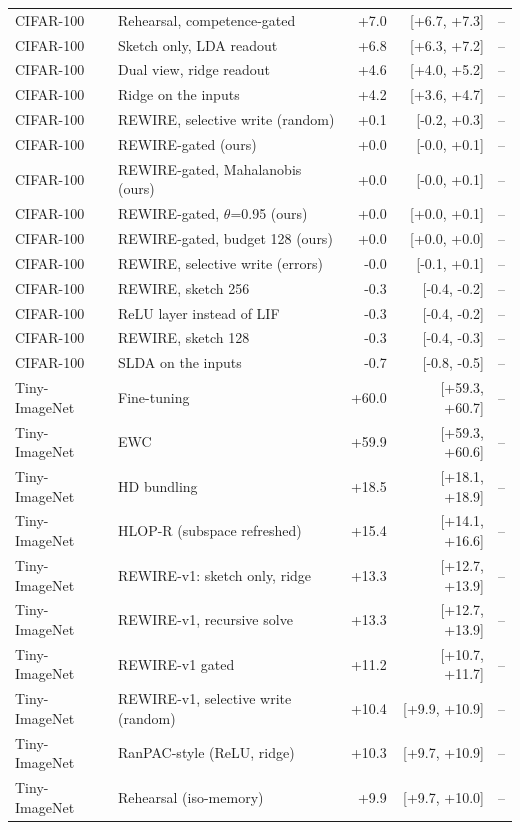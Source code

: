 \begin{tabular}{llrrr}
CIFAR-100 & Rehearsal, competence-gated & +7.0 & [+6.7, +7.3] & -- \\
CIFAR-100 & Sketch only, LDA readout & +6.8 & [+6.3, +7.2] & -- \\
CIFAR-100 & Dual view, ridge readout & +4.6 & [+4.0, +5.2] & -- \\
CIFAR-100 & Ridge on the inputs & +4.2 & [+3.6, +4.7] & -- \\
CIFAR-100 & REWIRE, selective write (random) & +0.1 & [-0.2, +0.3] & -- \\
CIFAR-100 & REWIRE-gated (ours) & +0.0 & [-0.0, +0.1] & -- \\
CIFAR-100 & REWIRE-gated, Mahalanobis (ours) & +0.0 & [-0.0, +0.1] & -- \\
CIFAR-100 & REWIRE-gated, $\theta$=0.95 (ours) & +0.0 & [+0.0, +0.1] & -- \\
CIFAR-100 & REWIRE-gated, budget 128 (ours) & +0.0 & [+0.0, +0.0] & -- \\
CIFAR-100 & REWIRE, selective write (errors) & -0.0 & [-0.1, +0.1] & -- \\
CIFAR-100 & REWIRE, sketch 256 & -0.3 & [-0.4, -0.2] & -- \\
CIFAR-100 & ReLU layer instead of LIF & -0.3 & [-0.4, -0.2] & -- \\
CIFAR-100 & REWIRE, sketch 128 & -0.3 & [-0.4, -0.3] & -- \\
CIFAR-100 & SLDA on the inputs & -0.7 & [-0.8, -0.5] & -- \\
Tiny-ImageNet & Fine-tuning & +60.0 & [+59.3, +60.7] & -- \\
Tiny-ImageNet & EWC & +59.9 & [+59.3, +60.6] & -- \\
Tiny-ImageNet & HD bundling & +18.5 & [+18.1, +18.9] & -- \\
Tiny-ImageNet & HLOP-R (subspace refreshed) & +15.4 & [+14.1, +16.6] & -- \\
Tiny-ImageNet & REWIRE-v1: sketch only, ridge & +13.3 & [+12.7, +13.9] & -- \\
Tiny-ImageNet & REWIRE-v1, recursive solve & +13.3 & [+12.7, +13.9] & -- \\
Tiny-ImageNet & REWIRE-v1 gated & +11.2 & [+10.7, +11.7] & -- \\
Tiny-ImageNet & REWIRE-v1, selective write (random) & +10.4 & [+9.9, +10.9] & -- \\
Tiny-ImageNet & RanPAC-style (ReLU, ridge) & +10.3 & [+9.7, +10.9] & -- \\
Tiny-ImageNet & Rehearsal (iso-memory) & +9.9 & [+9.7, +10.0] & -- \\

\end{tabular}
